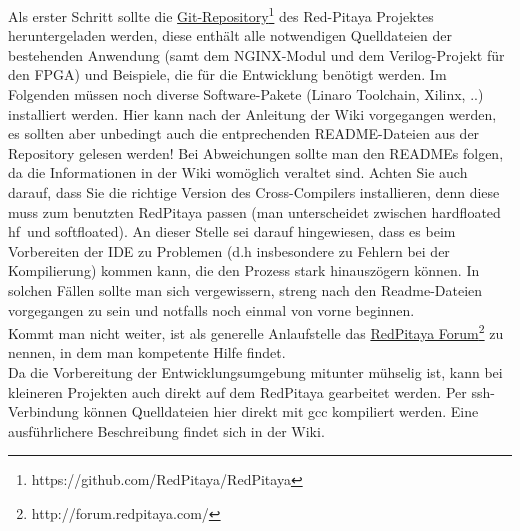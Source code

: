 \documentclass[11pt]{scrartcl}
\begin{document}
Als erster Schritt sollte die \href{https://github.com/RedPitaya/RedPitaya}{Git-Repository\footnote{https://github.com/RedPitaya/RedPitaya}} des Red-Pitaya Projektes heruntergeladen werden, diese enthält alle notwendigen Quelldateien der bestehenden Anwendung (samt dem NGINX-Modul und dem Verilog-Projekt für den FPGA) und Beispiele, die für die Entwicklung benötigt werden. Im Folgenden müssen noch diverse Software-Pakete (Linaro Toolchain, Xilinx, ..) installiert werden. Hier kann nach der Anleitung der Wiki vorgegangen werden, es sollten aber unbedingt auch die entprechenden README-Dateien aus der Repository gelesen werden! Bei Abweichungen sollte man den READMEs folgen, da die Informationen in der Wiki womöglich veraltet sind. Achten Sie auch darauf, dass Sie die richtige Version des Cross-Compilers installieren, denn diese muss zum benutzten RedPitaya passen (man unterscheidet zwischen hardfloated \grqq hf\grqq~und softfloated). An dieser Stelle sei darauf hingewiesen, dass es beim Vorbereiten der IDE zu Problemen (d.h insbesondere zu Fehlern bei der Kompilierung) kommen kann, die den Prozess stark hinauszögern können. In solchen Fällen sollte man sich vergewissern, streng nach den Readme-Dateien vorgegangen zu sein und notfalls noch einmal von vorne beginnen. \\

Kommt man nicht weiter, ist als generelle Anlaufstelle das \href{http://forum.redpitaya.com/}{RedPitaya Forum\footnote{http://forum.redpitaya.com/}} zu nennen, in dem man kompetente Hilfe findet.\\

Da die Vorbereitung der Entwicklungsumgebung mitunter mühselig ist, kann bei kleineren Projekten auch direkt auf dem RedPitaya gearbeitet werden. Per ssh-Verbindung können Quelldateien hier direkt mit gcc kompiliert werden. Eine ausführlichere Beschreibung findet sich in der Wiki.\\
 
\end{document}
